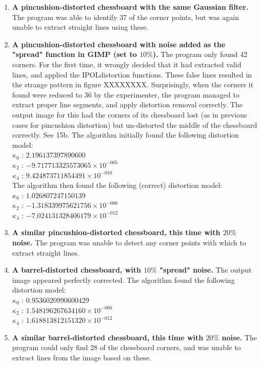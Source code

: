\begin{enumerate}
  \item \textbf{A pincushion-distorted chessboard with the same Gaussian filter.} The program was able to identify 37 of the corner points, but was again unable to extract straight lines using these.
  \item \textbf{A pincushion-distorted chessboard with noise added as the "spread" function in GIMP (set to $10\%$).} The program only found 42 corners. For the first time, it wrongly decided that it had extracted valid lines, and applied the IPOLdistortion functions. These false lines resulted in the strange pattern in figure XXXXXXXX. Surprisingly, when the corners it found were reduced to 36 by the experimenter, the program managed to extract proper line segments, and apply distortion removal correctly. The output image for this had the corners of its chessboard lost (as in previous cases for pincushion distortion) but un-distorted the middle of the chessboard correctly. See 15b. The algorithm initially found the following distortion model:\\
   $ \kappa_{0}$ : $2.196137397890600$\\
   $ \kappa_{2}$ : $-9.717713325573065 \times 10^{-005}$\\
   $ \kappa_{4}$ : $9.424873711854491 \times 10^{-010}$\\
The algorithm then found the following (correct) distortion model:\\
   $ \kappa_{0}$ : $1.026807247150139$\\
   $ \kappa_{2}$ : $-1.318339975621756 \times 10^{-006}$\\
   $ \kappa_{4}$ : $-7.024131328406179 \times 10^{-012}$
  \item \textbf{A similar pincushion-distorted chessboard, this time with $20\%$ noise.} The program was unable to detect any corner points with which to extract straight lines.
  \item \textbf{A barrel-distorted chessboard, with $10\%$ "spread" noise.} The output image appeared perfectly corrected. The algorithm found the following distortion model:\\
   $ \kappa_{0}$ : $0.9536020990600429$\\
   $ \kappa_{2}$ : $1.548196267634160 \times 10^{-006}$\\
   $ \kappa_{4}$ : $1.618813812151320 \times 10^{-012}$
  \item \textbf{A similar barrel-distorted chessboard, this time with $20\%$ noise.} The program could only find 28 of the chessboard corners, and was unable to extract lines from the image based on these.

\end{enumerate}
